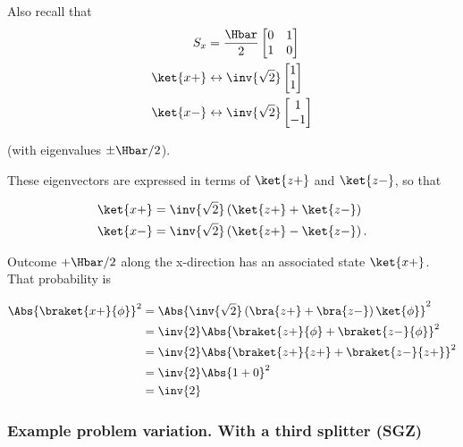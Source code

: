 Also recall that
\begin{equation}\label{eqn:PHY356Foct26:109}
\begin{aligned}
S_x &= \frac{\Hbar}{2}
\begin{bmatrix}
0 & 1 \\
1 & 0
\end{bmatrix} \\
\ket{x+} &\leftrightarrow
\inv{\sqrt{2}}
\begin{bmatrix}
1 \\
1
\end{bmatrix} \\
\ket{x-} &\leftrightarrow
\inv{\sqrt{2}}
\begin{bmatrix}
1 \\
-1
\end{bmatrix}
\end{aligned}
\end{equation}

(with eigenvalues \(\pm\Hbar/2\)).

These eigenvectors are expressed in terms of \(\ket{z+}\) and \(\ket{z-}\), so that

\begin{equation}\label{eqn:PHY356Foct26:110}
\begin{aligned}
\ket{x+}
&=
\inv{\sqrt{2}} \left( \ket{z+} + \ket{z-} \right) \\
\ket{x-}
&=
\inv{\sqrt{2}} \left( \ket{z+} - \ket{z-} \right) .
\end{aligned}
\end{equation}

Outcome \(+\Hbar/2\) along the x-direction has an associated state \(\ket{x+}\).  That probability is

\begin{equation}\label{eqn:lecture7sternGerlach:220}
\begin{aligned}
\Abs{\braket{x+}{\phi}}^2
&=
\Abs{
\inv{\sqrt{2}} \left( \bra{z+} + \bra{z-} \right) \ket{\phi}
}^2 \\
&=
\inv{2}
\Abs{
\braket{z+}{\phi} + \braket{z-}{\phi}
}^2 \\
&=
\inv{2}
\Abs{
\braket{z+}{z+} + \braket{z-}{z+}
}^2 \\
&=
\inv{2}
\Abs{
1 + 0
}^2 \\
&=
\inv{2}
\end{aligned}
\end{equation}

\subsubsection{Example problem variation.  With a third splitter (SGZ)}

